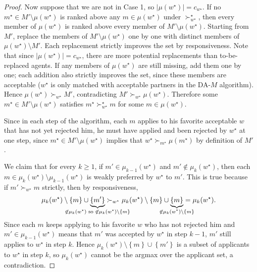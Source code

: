 \begin{proof}
	Now suppose that we are not in Case 1, so \(\left|\mu(w^\star)\right|=c_{w^\star}\). If no \(m^\star \in M'\setminus\mu(w^\star)\) is ranked above any \(m\in\mu(w^\star)\) under \(\succ_{w^\star}^\star\), then every member of \(\mu(w^\star)\) is ranked above every member of \(M'\setminus\mu(w^\star)\). Starting from \(M'\), replace the members of \(M'\setminus\mu(w^\star)\) one by one with distinct members of \(\mu(w^\star)\setminus M'\). Each replacement strictly improves the set by responsiveness. Note that since $\left| \mu(w^\star) \right| = c_{w^\star}$, there are more potential replacements than to-be-replaced agents. If any members of \(\mu(w^\star)\) are still missing, add them one by one; each addition also strictly improves the set, since these members are acceptable ($w^\star$ is only matched with acceptable partners in the DA-$M$ algorithm). Hence \(\mu(w^\star)\succ_{w^\star} M'\), contradicting \(M'\succ_{w^\star}\mu(w^\star)\). Therefore some \(m^\star\in M'\setminus\mu(w^\star)\) satisfies \(m^\star\succ_{w^\star}^\star m\) for some \(m\in\mu(w^\star)\).

	Since in each step of the algorithm, each $m$ applies to his favorite acceptable $w$ that has not yet rejected him, he must have applied and been rejected by $w^\star$ at one step, since $m^\star \in M' \setminus \mu(w^\star)$ implies that $w^\star \succ_{m^\star} \mu(m^\star)$ by definition of $M'$.


	We claim that for every $k \ge 1$, if $m' \in \mu_{k-1}(w^\star)$ and $m' \not\in \mu_k(w^\star)$, then each $m \in \mu_k(w^\star) \setminus \mu_{k-1}(w^\star)$ is weakly preferred by $w^\star$ to $m'$.
	This is true because if $m' \succ_{w^\star} m$ strictly, then by responsiveness, \[\mu_k(w^\star) \setminus \left\{m\right\} \cup \underbrace{\left\{m'\right\}}_{\mathclap{\not\in \mu_k(w^\star) \text{ so } \not\in \mu_k(w^\star) \setminus \left\{m\right\}}} \succ_{w^\star} \mu_k(w^\star) \setminus \left\{m\right\} \cup \underbrace{\left\{m\right\}}_{\mathclap{\not\in \mu_k(w^*) \setminus \left\{m\right\}}} = \mu_k(w^\star).\]
	Since each $m$ keeps applying to his favorite $w$ who has not rejected him and $m' \in \mu_{k-1}(w^\star)$ means that $m'$ was accepted by $w^\star$ in step $k-1$, $m'$ still applies to $w^\star$ in step $k$. Hence $\mu_k(w^\star) \setminus \left\{m\right\} \cup \left\{m'\right\}$ is a subset of applicants to $w^\star$ in step $k$, so $\mu_k(w^\star)$ cannot be the argmax over the applicant set, a contradiction.


\end{proof}
